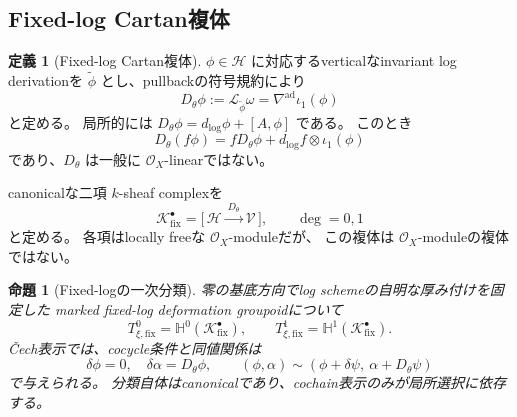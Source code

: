 \documentclass[uplatex,dvipdfmx,11pt]{jsarticle}
\numberwithin{equation}{section}
\theoremstyle{plain}
\newtheorem{proposition}[theorem]{命題}
\theoremstyle{definition}
\newtheorem{definition}[theorem]{定義}
\theoremstyle{remark}
\newcommand{\OO}{\mathcal O}
\newcommand{\shH}{\mathcal H}
\newcommand{\shV}{\mathcal V}
\newcommand{\Kfix}{\mathcal K_{\mathrm{fix}}^\bullet}
\newcommand{\nablaad}{\nabla^{\mathrm{ad}}}
\newcommand{\Hyp}{\mathbb H}
\begin{document}
\subsection{Fixed-log Cartan複体}

\begin{definition}[Fixed-log Cartan複体]
\label{def:K-fix}
\(\phi\in\shH\) に対応するverticalなinvariant log derivationを
\(\widetilde\phi\) とし、pullbackの符号規約により
\[
D_\theta\phi:=\mathcal L_{\widetilde\phi}\omega
=\nablaad\iota_1(\phi)
\]
と定める。
局所的には \(D_\theta\phi=d_{\log}\phi+[A,\phi]\) である。
このとき
\begin{equation}
\label{eq:Dtheta-leibniz}
D_\theta(f\phi)=fD_\theta\phi+d_{\log}f\otimes\iota_1(\phi)
\end{equation}
であり、\(D_\theta\) は一般に \(\OO_X\)-linearではない。

canonicalな二項 \(k\)-sheaf complexを
\begin{equation}
\label{eq:K-fix}
\Kfix=\bigl[\,\shH\xrightarrow{\ D_\theta\ }\shV\,\bigr],
\qquad\deg=0,1
\end{equation}
と定める。
各項はlocally freeな \(\OO_X\)-moduleだが、
この複体は \(\OO_X\)-moduleの複体ではない。
\end{definition}

\begin{proposition}[Fixed-logの一次分類]
\label{prop:fixed-log-classification}
零の基底方向でlog schemeの自明な厚み付けを固定した
marked fixed-log deformation groupoidについて
\begin{equation}
\label{eq:fixed-log-classification}
T^0_{\xi,\mathrm{fix}}=\Hyp^0(\Kfix),
\qquad
T^1_{\xi,\mathrm{fix}}=\Hyp^1(\Kfix).
\end{equation}
Čech表示では、cocycle条件と同値関係は
\begin{equation}
\label{eq:fixed-log-cech}
\delta\phi=0,\quad \delta\alpha=D_\theta\phi,
\qquad
(\phi,\alpha)\sim(\phi+\delta\psi,\ \alpha+D_\theta\psi)
\end{equation}
で与えられる。
分類自体はcanonicalであり、cochain表示のみが局所選択に依存する。
\end{proposition}
\end{document}
